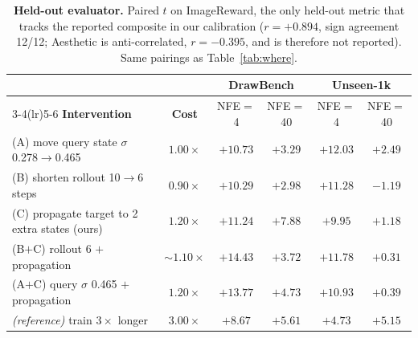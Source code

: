 \begin{table}[t]
\centering
\setlength{\tabcolsep}{5pt}
\caption{\textbf{Held-out evaluator.} Paired $t$ on ImageReward, the only held-out metric that
tracks the reported composite in our calibration ($r{=}{+}0.894$, sign agreement 12/12; Aesthetic is
anti-correlated, $r{=}{-}0.395$, and is therefore not reported). Same pairings as Table~\ref{tab:where}.}
\label{tab:heldout}
\begin{tabular}{lc cc cc}
\toprule
& & \multicolumn{2}{c}{\textbf{DrawBench}} & \multicolumn{2}{c}{\textbf{Unseen-1k}} \\
\cmidrule(lr){3-4}\cmidrule(lr){5-6}
\textbf{Intervention} & \textbf{Cost} & NFE$=$4 & NFE$=$40 & NFE$=$4 & NFE$=$40 \\
\midrule
(A) move query state $\sigma$ 0.278$\to$0.465 & $1.00\times$ & $+10.73$ & $+3.29$ & $+12.03$ & $+2.49$ \\
(B) shorten rollout 10$\to$6 steps & $0.90\times$ & $+10.29$ & $+2.98$ & $+11.28$ & $-1.19$ \\
(C) propagate target to 2 extra states (ours) & $1.20\times$ & $+11.24$ & $+7.88$ & $+9.95$ & $+1.18$ \\
(B$+$C) rollout 6 $+$ propagation & $\sim\!1.10\times$ & $+14.43$ & $+3.72$ & $+11.78$ & $+0.31$ \\
(A$+$C) query $\sigma$ 0.465 $+$ propagation & $1.20\times$ & $+13.77$ & $+4.73$ & $+10.93$ & $+0.39$ \\
\;\emph{(reference)} train $3\times$ longer & $3.00\times$ & $+8.67$ & $+5.61$ & $+4.73$ & $+5.15$ \\
\bottomrule
\end{tabular}
\end{table}
